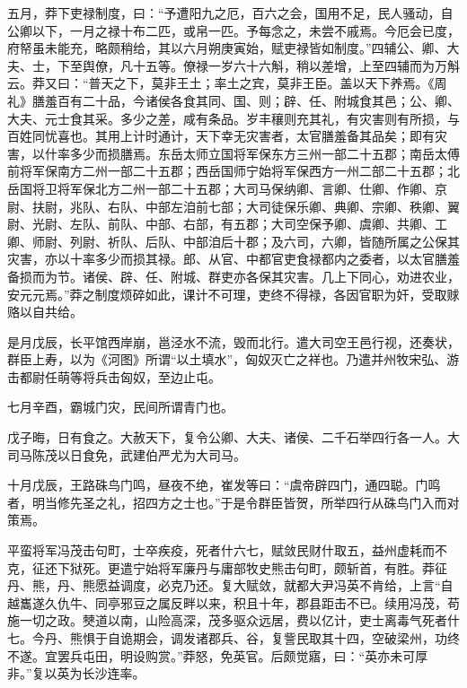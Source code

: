 \documentclass[12pt,UTF8]{ctexbook}
\begin{document}
五月，莽下吏禄制度，曰：“予遭阳九之厄，百六之会，国用不足，民人骚动，自公卿以下，一月之禄十布二匹，或帛一匹。予每念之，未尝不戚焉。今厄会已度，府帑虽未能充，略颇稍给，其以六月朔庚寅始，赋吏禄皆如制度。”四辅公、卿、大夫、士，下至舆僚，凡十五等。僚禄一岁六十六斛，稍以差增，上至四辅而为万斛云。莽又曰：“普天之下，莫非王土；率土之宾，莫非王臣。盖以天下养焉。《周礼》膳羞百有二十品，今诸侯各食其同、国、则；辟、任、附城食其邑；公、卿、大夫、元士食其采。多少之差，咸有条品。岁丰穰则充其礼，有灾害则有所损，与百姓同忧喜也。其用上计时通计，天下幸无灾害者，太官膳羞备其品矣；即有灾害，以什率多少而损膳焉。东岳太师立国将军保东方三州一部二十五郡；南岳太傅前将军保南方二州一部二十五郡；西岳国师宁始将军保西方一州二部二十五郡；北岳国将卫将军保北方二州一部二十五郡；大司马保纳卿、言卿、仕卿、作卿、京尉、扶尉，兆队、右队、中部左洎前七部；大司徒保乐卿、典卿、宗卿、秩卿、翼尉、光尉、左队、前队、中部、右部，有五郡；大司空保予卿、虞卿、共卿、工卿、师尉、列尉、祈队、后队、中部洎后十郡；及六司，六卿，皆随所属之公保其灾害，亦以十率多少而损其禄。郎、从官、中都官吏食禄都内之委者，以太官膳羞备损而为节。诸侯、辟、任、附城、群吏亦各保其灾害。几上下同心，劝进农业，安元元焉。”莽之制度烦碎如此，课计不可理，吏终不得禄，各因官职为奸，受取赇赂以自共给。



是月戊辰，长平馆西岸崩，邕泾水不流，毁而北行。遣大司空王邑行视，还奏状，群臣上寿，以为《河图》所谓“以土填水”，匈奴灭亡之祥也。乃遣并州牧宋弘、游击都尉任萌等将兵击匈奴，至边止屯。



七月辛酉，霸城门灾，民间所谓青门也。



戊子晦，日有食之。大赦天下，复令公卿、大夫、诸侯、二千石举四行各一人。大司马陈茂以日食免，武建伯严尤为大司马。



十月戊辰，王路硃鸟门鸣，昼夜不绝，崔发等曰：“虞帝辟四门，通四聪。门鸣者，明当修先圣之礼，招四方之士也。”于是令群臣皆贺，所举四行从硃鸟门入而对策焉。



平蛮将军冯茂击句町，士卒疾疫，死者什六七，赋敛民财什取五，益州虚耗而不克，征还下狱死。更遣宁始将军廉丹与庸部牧史熊击句町，颇斩首，有胜。莽征丹、熊，丹、熊愿益调度，必克乃还。复大赋敛，就都大尹冯英不肯给，上言“自越巂遂久仇牛、同亭邪豆之属反畔以来，积且十年，郡县距击不已。续用冯茂，苟施一切之政。僰道以南，山险高深，茂多驱众远居，费以亿计，吏士离毒气死者什七。今丹、熊惧于自诡期会，调发诸郡兵、谷，复訾民取其十四，空破梁州，功终不遂。宜罢兵屯田，明设购赏。”莽怒，免英官。后颇觉寤，曰：“英亦未可厚非。”复以英为长沙连率。
\end{document}

